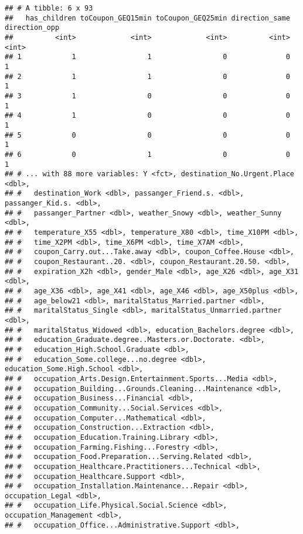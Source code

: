 \documentclass[
]{article}
\begin{document}
\begin{verbatim}
## # A tibble: 6 x 93
##   has_children toCoupon_GEQ15min toCoupon_GEQ25min direction_same direction_opp
##          <int>             <int>             <int>          <int>         <int>
## 1            1                 1                 0              0             1
## 2            1                 1                 0              0             1
## 3            1                 0                 0              0             1
## 4            1                 0                 0              0             1
## 5            0                 0                 0              0             1
## 6            0                 1                 0              0             1
## # ... with 88 more variables: Y <fct>, destination_No.Urgent.Place <dbl>,
## #   destination_Work <dbl>, passanger_Friend.s. <dbl>, passanger_Kid.s. <dbl>,
## #   passanger_Partner <dbl>, weather_Snowy <dbl>, weather_Sunny <dbl>,
## #   temperature_X55 <dbl>, temperature_X80 <dbl>, time_X10PM <dbl>,
## #   time_X2PM <dbl>, time_X6PM <dbl>, time_X7AM <dbl>,
## #   coupon_Carry.out...Take.away <dbl>, coupon_Coffee.House <dbl>,
## #   coupon_Restaurant..20. <dbl>, coupon_Restaurant.20.50. <dbl>,
## #   expiration_X2h <dbl>, gender_Male <dbl>, age_X26 <dbl>, age_X31 <dbl>,
## #   age_X36 <dbl>, age_X41 <dbl>, age_X46 <dbl>, age_X50plus <dbl>,
## #   age_below21 <dbl>, maritalStatus_Married.partner <dbl>,
## #   maritalStatus_Single <dbl>, maritalStatus_Unmarried.partner <dbl>,
## #   maritalStatus_Widowed <dbl>, education_Bachelors.degree <dbl>,
## #   education_Graduate.degree..Masters.or.Doctorate. <dbl>,
## #   education_High.School.Graduate <dbl>,
## #   education_Some.college...no.degree <dbl>, education_Some.High.School <dbl>,
## #   occupation_Arts.Design.Entertainment.Sports...Media <dbl>,
## #   occupation_Building...Grounds.Cleaning...Maintenance <dbl>,
## #   occupation_Business...Financial <dbl>,
## #   occupation_Community...Social.Services <dbl>,
## #   occupation_Computer...Mathematical <dbl>,
## #   occupation_Construction...Extraction <dbl>,
## #   occupation_Education.Training.Library <dbl>,
## #   occupation_Farming.Fishing...Forestry <dbl>,
## #   occupation_Food.Preparation...Serving.Related <dbl>,
## #   occupation_Healthcare.Practitioners...Technical <dbl>,
## #   occupation_Healthcare.Support <dbl>,
## #   occupation_Installation.Maintenance...Repair <dbl>, occupation_Legal <dbl>,
## #   occupation_Life.Physical.Social.Science <dbl>, occupation_Management <dbl>,
## #   occupation_Office...Administrative.Support <dbl>,

\end{verbatim}
\end{document}
